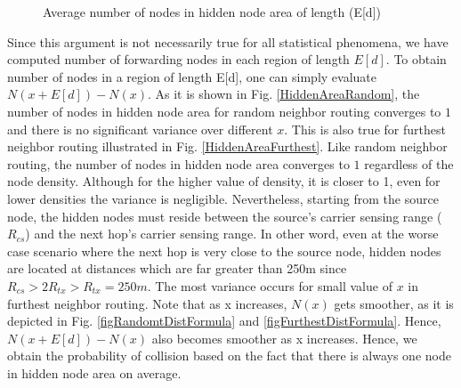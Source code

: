 \documentclass[12pt, draftclsnofoot, onecolumn]{IEEEtran}
\begin{document}
%




\begin{figure*}[t!]
\begin{center}
\caption{Average number of nodes in hidden node area of length (E[d])}
\label{figHidArea}
\end{center}
\end{figure*}


Since this argument is not necessarily true for all statistical 
phenomena, we have computed number of forwarding nodes 
in each region of length $E[d]$. To obtain number of nodes in 
a region of length E[d], one can simply evaluate $N(x+E[d])-N(x)$. 
As it is shown in Fig. \ref{HiddenAreaRandom}, the number of nodes 
in hidden node area for random neighbor routing converges to $1$ and 
there is no significant variance over different $x$. This is also true for 
furthest neighbor routing illustrated in Fig. \ref{HiddenAreaFurthest}. 
Like random neighbor routing, the number of nodes in hidden node area 
converges to $1$ regardless of the node density. Although for the higher 
value of density, it is closer to 1, even for lower densities the variance 
is negligible. Nevertheless, starting from the source node, the hidden nodes must reside between the source's carrier sensing range ($R_{cs}$) and the next hop's carrier sensing range. In other word, even at the worse case scenario where the next hop is very close to the source node, hidden nodes are located at distances which are far greater than 250m  since  $R_{cs}>2R_{tx}>R_{tx}=250m$. The most variance occurs for small value of $x$ in furthest neighbor routing. Note that as x increases, $N(x)$ gets smoother, as it is depicted in Fig. \ref{figRandomtDistFormula} and \ref{figFurthestDistFormula}. Hence, $N(x+E[d])-N(x)$ also becomes smoother as x increases.
Hence, we obtain the probability of collision based on the 
fact that there is always one node in hidden node area on average.
\end{document}
